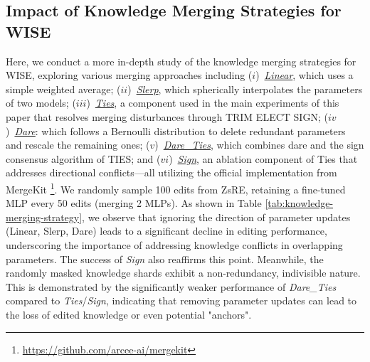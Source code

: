 \subsection{Impact of Knowledge Merging Strategies for WISE} \label{app_sec:varying_merge}
\begin{table}
    \centering
    \caption{\small Varying Merging Strategy. ZsRE. \texttt{LLaMA-2-7B}.}
    \vspace{-10pt}
    \label{tab:knowledge-merging-strategy}
\end{table}

Here, we conduct a more in-depth study of the knowledge merging strategies for WISE, exploring various merging approaches including ($i$)~\underline{\textit{Linear}}, which uses a simple weighted average;
($ii$)~\underline{\textit{Slerp}}, which spherically interpolates the parameters of two models;
($iii$)~\underline{\textit{Ties}}, a component used in the main experiments of this paper that resolves merging disturbances through TRIM ELECT SIGN;
($iv$)~\underline{\textit{Dare}}: which follows a Bernoulli distribution to delete redundant parameters and rescale the remaining ones;
($v$)~\underline{\textit{Dare\_Ties}}, which combines dare and the sign consensus algorithm of TIES;
and ($vi$)~\underline{\textit{Sign}}, an ablation component of Ties that addresses directional conflicts—all utilizing the official implementation from MergeKit \cite{mergekit} \footnote{\url{https://github.com/arcee-ai/mergekit}}.
We randomly sample 100 edits from ZsRE, retaining a fine-tuned MLP every 50 edits (merging 2 MLPs).
As shown in Table \ref{tab:knowledge-merging-strategy}, we observe that ignoring the direction of parameter updates (Linear, Slerp, Dare) leads to a significant decline in editing performance, underscoring the importance of addressing knowledge conflicts in overlapping parameters.
The success of \textit{Sign} also reaffirms this point.
Meanwhile, the randomly masked knowledge shards exhibit a non-redundancy, indivisible nature.
This is demonstrated by the significantly weaker performance of \textit{Dare\_Ties} compared to \textit{Ties}/\textit{Sign}, indicating that removing parameter updates can lead to the loss of edited knowledge or even potential "anchors".

